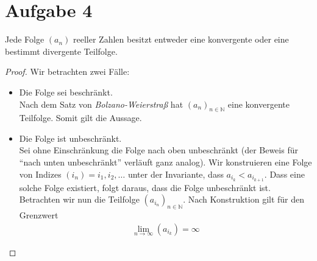 \documentclass{scrreprt}
\newcommand{\NN}{\mathbb{N}}
\begin{document}
    \section*{Aufgabe 4}
    Jede Folge $(a_{n})$ reeller Zahlen besitzt entweder eine konvergente oder eine bestimmt divergente Teilfolge.
    \begin{proof}
    Wir betrachten zwei Fälle:
    \begin{itemize}
        \item
            Die Folge sei beschränkt.\\
            Nach dem Satz von \emph{Bolzano-Weierstraß} hat $(a_n)_{n \in \NN}$ eine konvergente Teilfolge. Somit gilt die Aussage.
        \item
            Die Folge ist unbeschränkt.\\
            Sei ohne Einschränkung die Folge nach oben unbeschränkt (der Beweis für "`nach unten unbeschränkt"' verläuft ganz analog). Wir konstruieren eine Folge von Indizes $(i_n) = i_1, i_2, \dots$ unter der Invariante, dass $a_{i_k} < a_{i_{k+1}}$. Dass eine solche Folge existiert, folgt daraus, dass die Folge unbeschränkt ist. Betrachten wir nun die Teilfolge $(a_{i_n})_{n \in \NN}$. Nach Konstruktion gilt für den Grenzwert
            \begin{align*}
                \lim\limits_{n \to \infty} (a_{i_k}) = \infty
            \end{align*}
    \end{itemize}
    \end{proof}
\end{document}
